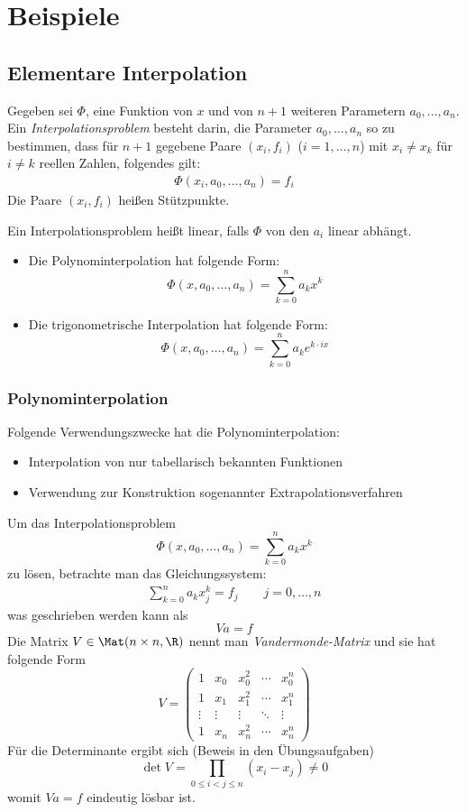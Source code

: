 \documentclass{mycourse}
\begin{document}
\chapter{Beispiele}

\section{Elementare Interpolation}

Gegeben sei $\Phi$, eine Funktion von $x$ und von $n+1$ weiteren Parametern $a_0,\dotsc, a_n$.
Ein \emph{Interpolationsproblem} besteht darin, die Parameter $a_0,\dotsc, a_n$ so zu bestimmen, dass für $n+1$ gegebene Paare $(x_i, f_i)$ ($i=1,\dotsc,n$) mit $x_i\neq x_k$ für $i\neq k$ reellen Zahlen, folgendes gilt:
\begin{align}
	\label{eq:5.1}
	\Phi(x_i, a_0,\dotsc, a_n) = f_i
\end{align}
Die Paare $(x_i, f_i)$ heißen Stützpunkte.

Ein Interpolationsproblem heißt linear, falls $\Phi$ von den $a_i$ linear abhängt.

\begin{ex*}
	\begin{itemize}
		\item
			Die Polynominterpolation hat folgende Form:
			\[
				\Phi(x,a_0,\dotsc, a_n) = \sum_{k=0}^n a_kx^k
			\]
		\item
			Die trigonometrische Interpolation hat folgende Form:
			\[
				\Phi(x,a_0,\dotsc, a_n) = \sum_{k=0}^n a_ke^{k\cdot ix}
			\]
	\end{itemize}
\end{ex*}

\subsection{Polynominterpolation}

Folgende Verwendungszwecke hat die Polynominterpolation:
\begin{itemize}
	\item
		Interpolation von nur tabellarisch bekannten Funktionen
	\item
		Verwendung zur Konstruktion sogenannter Extrapolationsverfahren
\end{itemize}
Um das Interpolationsproblem
\[
	\Phi(x,a_0,\dotsc, a_n) = \sum_{k=0}^n a_kx^k
\]
zu lösen, betrachte man das Gleichungssystem:
\begin{align}
	\sum_{k=0}^n a_kx_j^k = f_j \qquad j=0,\dotsc, n \label{eq:5.2}
\end{align}
was geschrieben werden kann als
\[
	V a = f
\]
Die Matrix $V \in \Mat(n\times n, \R)$ nennt man \emph{Vandermonde-Matrix} und sie hat folgende Form
\[
	V = \begin{pmatrix}1 & x_0 & x_0^2 & \cdots & x_0^n\\
	1 & x_1 & x_1^2 &\cdots & x_1^n\\
	\vdots & \vdots & \vdots & \ddots & \vdots \\
	1& x_n & x_n^2  & \cdots & x_n^n
\end{pmatrix}	 
\]
Für die Determinante ergibt sich (Beweis in den Übungsaufgaben)
\[
	\det V = \prod_{0\le i<j\le n}(x_i-x_j) \neq 0
\]
womit $Va = f$ eindeutig lösbar ist.
\end{document}

